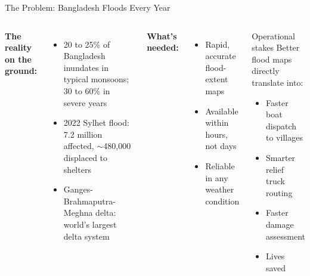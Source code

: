 \documentclass[10pt,aspectratio=169]{beamer}
\begin{document}
\begin{frame}{The Problem: Bangladesh Floods Every Year}
\begin{columns}[T,onlytextwidth]
\textbf{The reality on the ground:}
\begin{itemize}
\item 20 to 25\% of Bangladesh inundates in typical monsoons; 30 to 60\% in severe years
\item 2022 Sylhet flood: 7.2 million affected, $\sim$480{,}000 displaced to shelters
\item Ganges-Brahmaputra-Meghna delta: world's largest delta system
\end{itemize}

\vspace{0.5em}
\textbf{What's needed:}
\begin{itemize}
\item Rapid, accurate flood-extent maps
\item Available within hours, not days
\item Reliable in any weather condition
\end{itemize}

\begin{block}{Operational stakes}
Better flood maps directly translate into:
\begin{itemize}
\item Faster boat dispatch to villages
\item Smarter relief truck routing
\item Faster damage assessment
\item Lives saved
\end{itemize}
\end{block}
\end{columns}
\end{frame}
\end{document}

